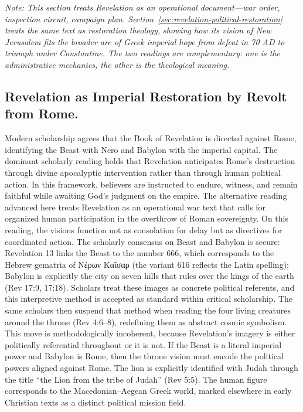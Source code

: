 \emph{Note: This section treats Revelation as an operational document---war order, inspection circuit, campaign plan.
Section~\ref{sec:revelation-political-restoration} treats the same text as restoration theology, showing how its vision of New Jerusalem fits the broader arc of Greek imperial hope from defeat in 70 AD to triumph under Constantine.
The two readings are complementary: one is the administrative mechanics, the other is the theological meaning.}

\subsection{Revelation as Imperial Restoration by Revolt from Rome.}\label{subsec:revelation-as-imperial-restoration-by-revolt-from-rome}
Modern scholarship agrees that the Book of Revelation is directed against Rome, identifying the Beast with Nero and Babylon with the imperial capital.
The dominant scholarly reading holds that Revelation anticipates Rome's destruction through divine apocalyptic intervention rather than through human political action.
In this framework, believers are instructed to endure, witness, and remain faithful while awaiting God's judgment on the empire.
The alternative reading advanced here treats Revelation as an operational war text that calls for organized human participation in the overthrow of Roman sovereignty.
On this reading, the visions function not as consolation for delay but as directives for coordinated action.
The scholarly consensus on Beast and Babylon is secure: Revelation 13 links the Beast to the number 666, which corresponds to the Hebrew gematria of Νέρων Καῖσαρ (the variant 616 reflects the Latin spelling); Babylon is explicitly the city on seven hills that rules over the kings of the earth (Rev 17:9, 17:18).
Scholars treat these images as concrete political referents, and this interpretive method is accepted as standard within critical scholarship.
The same scholars then suspend that method when reading the four living creatures around the throne (Rev 4:6--8), redefining them as abstract cosmic symbolism.
This move is methodologically incoherent, because Revelation's imagery is either politically referential throughout or it is not.
If the Beast is a literal imperial power and Babylon is Rome, then the throne vision must encode the political powers aligned against Rome.
The lion is explicitly identified with Judah through the title ``the Lion from the tribe of Judah'' (Rev 5:5).
The human figure corresponds to the Macedonian--Aegean Greek world, marked elsewhere in early Christian texts as a distinct political mission field.
